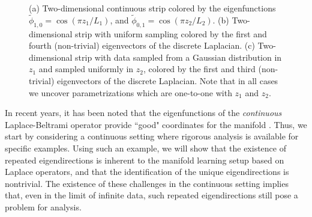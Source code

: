 \begin{figure}[t]
\begin{subfigure}{0.3\textwidth}
\caption{}
\label{subfig:strip_evecs_nonuniform}
\end{subfigure}
%
\caption{(a) Two-dimensional continuous strip colored by the eigenfunctions $\tilde{\phi}_{1, 0} = \cos \left( {\pi z_1}/{L_1} \right)$, and $\tilde{\phi}_{0, 1} = \cos \left( {\pi z_2}/{L_2} \right)$. (b) Two-dimensional strip with uniform sampling colored by the first and fourth (non-trivial) eigenvectors of the discrete Laplacian. (c) Two-dimensional strip with data sampled from a Gaussian distribution in $z_1$ and sampled uniformly in $z_2$, colored by the first and third (non-trivial) eigenvectors of the discrete Laplacian. Note that in all cases we uncover parametrizations which are one-to-one with $z_1$ and $z_2$.}
\end{figure}

In recent years, it has been noted that the eigenfunctions of the \emph{continuous} Laplace-Beltrami operator provide ``good" coordinates for the manifold \cite{jones2008}.
%
Thus, we start by considering a continuous setting where rigorous analysis is available for specific examples.
%
Using such an example, we will show that the existence of repeated eigendirections is inherent to the manifold learning setup based on Laplace operators, and that the identification of the unique eigendirections is nontrivial.
%
The existence of these challenges in the continuous setting implies that, even in the limit of infinite data, such repeated eigendirections still pose a problem for analysis.

